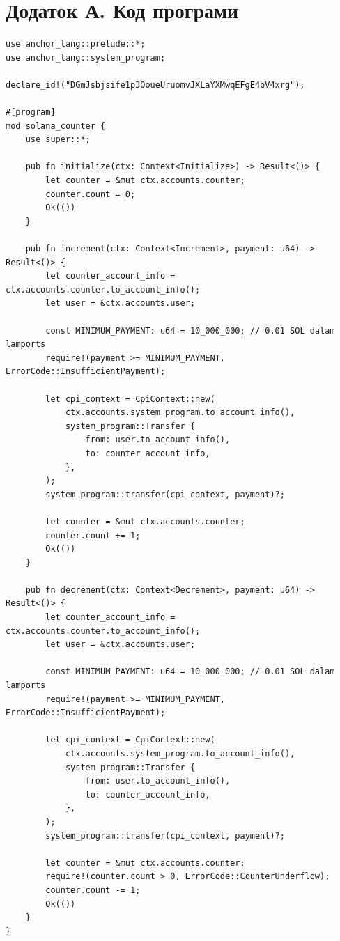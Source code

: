 \documentclass[14pt]{extreport}
\begin{document}
\section*{Додаток А.\hspace{0.5em} Код програми}
{\small
\begin{lstlisting}
use anchor_lang::prelude::*;
use anchor_lang::system_program;

declare_id!("DGmJsbjsife1p3QoueUruomvJXLaYXMwqEFgE4bV4xrg");

#[program]
mod solana_counter {
    use super::*;

    pub fn initialize(ctx: Context<Initialize>) -> Result<()> {
        let counter = &mut ctx.accounts.counter;
        counter.count = 0;
        Ok(())
    }

    pub fn increment(ctx: Context<Increment>, payment: u64) -> Result<()> {
        let counter_account_info = ctx.accounts.counter.to_account_info();
        let user = &ctx.accounts.user;

        const MINIMUM_PAYMENT: u64 = 10_000_000; // 0.01 SOL dalam lamports
        require!(payment >= MINIMUM_PAYMENT, ErrorCode::InsufficientPayment);

        let cpi_context = CpiContext::new(
            ctx.accounts.system_program.to_account_info(),
            system_program::Transfer {
                from: user.to_account_info(),
                to: counter_account_info,
            },
        );
        system_program::transfer(cpi_context, payment)?;

        let counter = &mut ctx.accounts.counter;
        counter.count += 1;
        Ok(())
    }

    pub fn decrement(ctx: Context<Decrement>, payment: u64) -> Result<()> {
        let counter_account_info = ctx.accounts.counter.to_account_info();
        let user = &ctx.accounts.user;

        const MINIMUM_PAYMENT: u64 = 10_000_000; // 0.01 SOL dalam lamports
        require!(payment >= MINIMUM_PAYMENT, ErrorCode::InsufficientPayment);

        let cpi_context = CpiContext::new(
            ctx.accounts.system_program.to_account_info(),
            system_program::Transfer {
                from: user.to_account_info(),
                to: counter_account_info,
            },
        );
        system_program::transfer(cpi_context, payment)?;

        let counter = &mut ctx.accounts.counter;
        require!(counter.count > 0, ErrorCode::CounterUnderflow);
        counter.count -= 1;
        Ok(())
    }
}


\end{lstlisting}}
\end{document}
